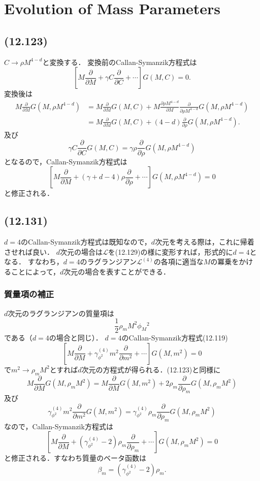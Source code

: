 \section{Evolution of Mass Parameters}
\subsection{(12.123)}
$C \to \rho M^{4-d}$と変換する．
変換前のCallan-Symanzik方程式は
\[ \left[ M \frac{\partial}{\partial M} + \gamma C \frac{\partial}{\partial C} + \cdots \right] G(M, C) = 0. \]
変換後は
\begin{align*}
  M \frac{\partial}{\partial M} G(M, \rho M^{4-d})
  &= M \frac{\partial}{\partial M} G(M, C) + M \frac{\partial\rho M^{4-d}}{\partial M} \frac{\partial}{\partial\rho M^{4-d}} G(M, \rho M^{4-d}) \\
  &= M \frac{\partial}{\partial M} G(M, C) + (4-d) \frac{\partial}{\partial\rho} G(M, \rho M^{4-d}) .
\end{align*}
及び
\[
\gamma C \frac{\partial}{\partial C} G(M, C) = \gamma \rho \frac{\partial}{\partial\rho} G(M, \rho M^{4-d})
\]
となるので，Callan-Symanzik方程式は
\[
\left[ M \frac{\partial}{\partial M} + (\gamma + d - 4) \rho \frac{\partial}{\partial\rho} + \cdots \right] G(M, \rho M^{4-d}) = 0
\]
と修正される．

\subsection{(12.131)}
$d = 4$のCallan-Symanzik方程式は既知なので，$d$次元を考える際は，これに帰着させれば良い．
$d$次元の場合は$\mathcal{L}$を(12.129)の様に変形すれば，形式的に$d = 4$となる．
すなわち，$d = 4$のラグランジアン$\mathcal{L}^{(4)}$の各項に適当な$M$の冪乗をかけることによって，$d$次元の場合を表すことができる．

\subsubsection{質量項の補正}
$d$次元のラグランジアンの質量項は
\[ \frac{1}{2} \rho_m M^2 \phi_M{}^2 \]
である（$d = 4$の場合と同じ）．
$d = 4$のCallan-Symanzik方程式(12.119)
\[
\left[ M \frac{\partial}{\partial M} + \gamma_{\phi^2}^{(4)} m^2 \frac{\partial}{\partial m^2} + \cdots \right] G(M, m^2) = 0
\]
で$m^2 \to \rho_m M^2$とすれば$d$次元の方程式が得られる．(12.123)と同様に
\[
M \frac{\partial}{\partial M} G(M, \rho_m M^2)
= M \frac{\partial}{\partial M} G(M, m^2) + 2 \rho_m \frac{\partial}{\partial\rho_m} G(M, \rho_m M^2)
\]
及び
\[
\gamma_{\phi^2}^{(4)} m^2 \frac{\partial}{\partial m^2} G(M, m^2)
= \gamma_{\phi^2}^{(4)} \rho_m \frac{\partial}{\partial\rho_m} G(M, \rho_m M^2)
\]
なので，Callan-Symanzik方程式は
\[
\left[ M \frac{\partial}{\partial M} + (\gamma_{\phi^2}^{(4)} - 2) \rho_m \frac{\partial}{\partial\rho_m} + \cdots \right] G(M, \rho_m M^2) = 0
\]
と修正される．すなわち質量のベータ函数は
\[ \beta_m = (\gamma_{\phi^2}^{(4)} - 2) \rho_m . \]

